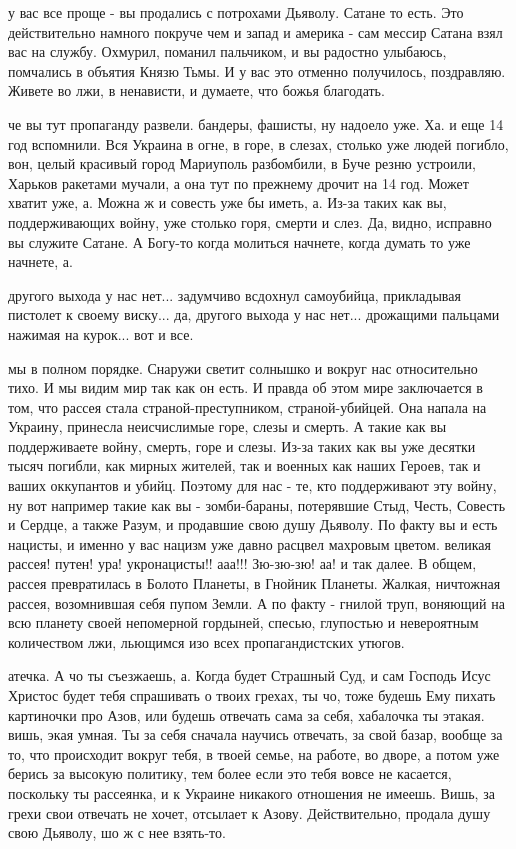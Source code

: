 у вас все проще - вы продались с потрохами Дьяволу. Сатане то есть. Это
действительно намного покруче чем и запад и америка - сам мессир Сатана взял
вас на службу. Охмурил, поманил пальчиком, и вы радостно улыбаюсь, помчались в
объятия Князю Тьмы. И у вас это отменно получилось, поздравляю. Живете во лжи,
в ненависти, и думаете, что божья благодать.

че вы тут пропаганду развели. бандеры, фашисты, ну надоело уже.  Ха. и еще 14
год вспомнили. Вся Украина в огне, в горе, в слезах, столько уже людей погибло,
вон, целый красивый город Мариуполь разбомбили, в Буче резню устроили, Харьков
ракетами мучали, а она тут по прежнему дрочит на 14 год. Может хватит уже, а.
Можна ж и совесть уже бы иметь, а. Из-за таких как вы, поддерживающих войну,
уже столько горя, смерти и слез. Да, видно, исправно вы служите Сатане. А
Богу-то когда молиться начнете, когда думать то уже начнете, а.

другого выхода у нас нет... задумчиво всдохнул самоубийца, прикладывая пистолет
к своему виску... да, другого выхода у нас нет... дрожащими пальцами нажимая на
курок... вот и все.

мы в полном порядке. Снаружи светит солнышко и вокруг нас относительно тихо. И
мы видим мир так как он есть. И правда об этом мире заключается в том, что
рассея стала страной-преступником, страной-убийцей. Она напала на Украину,
принесла неисчислимые горе, слезы и смерть. А такие как вы поддерживаете войну,
смерть, горе и слезы. Из-за таких как вы уже десятки тысяч погибли, как мирных
жителей, так и военных как наших Героев, так и ваших оккупантов и убийц.
Поэтому для нас - те, кто поддерживают эту войну, ну вот например такие как вы
- зомби-бараны, потерявшие Стыд, Честь, Совесть и Сердце, а также Разум, и
продавшие свою душу Дьяволу. По факту вы и есть нацисты, и именно у вас нацизм
уже давно расцвел махровым цветом. великая рассея! путен! ура! укронацисты!!
ааа!!! Зю-зю-зю! аа! и так далее. В общем, рассея превратилась в Болото
Планеты, в Гнойник Планеты. Жалкая, ничтожная рассея, возомнившая себя пупом
Земли. А по факту - гнилой труп, воняющий на всю планету своей непомерной
гордыней, спесью, глупостью и невероятным количеством лжи, льющимся изо всех
пропагандистских утюгов.

атечка. А чо ты съезжаешь, а. Когда будет Страшный Суд, и сам Господь Исус
Христос будет тебя спрашивать о твоих грехах, ты чо, тоже будешь Ему пихать
картиночки про Азов, или будешь отвечать сама за себя, хабалочка ты этакая.
вишь, экая умная. Ты за себя сначала научись отвечать, за свой базар, вообще за
то, что происходит вокруг тебя, в твоей семье, на работе, во дворе, а потом уже
берись за высокую политику, тем более если это тебя вовсе не касается,
поскольку ты рассеянка, и к Украине никакого отношения не имеешь. Вишь, за
грехи свои отвечать не хочет, отсылает к Азову. Действительно, продала душу
свою Дьяволу, шо ж с нее взять-то.

